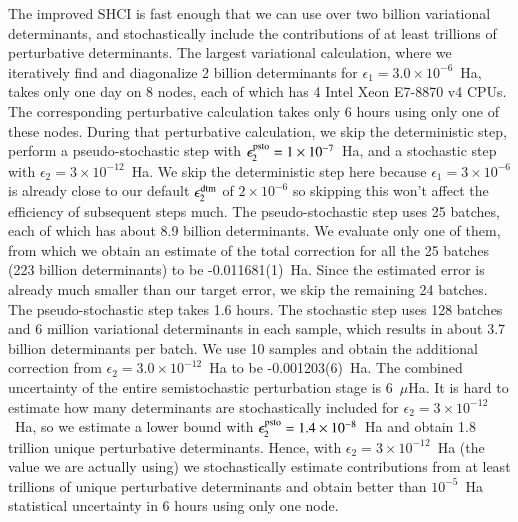 The improved SHCI is fast enough that we can use over two billion variational determinants, and stochastically include the contributions of at least trillions of perturbative determinants.
The largest variational calculation, where we iteratively find and diagonalize 2 billion determinants
for $\epsilon_1=3.0\times10^{-6}$~Ha, takes only one day on 8 nodes, each of which has 4 Intel Xeon E7-8870 v4 CPUs.
The corresponding perturbative calculation takes only 6 hours using only one of these nodes. 
During that perturbative calculation, we skip the deterministic step, perform a pseudo-stochastic step with $\epsilon_2^{\rm psto}=1\times10^{-7}$~Ha, and a stochastic step with $\epsilon_2=3\times10^{-12}$~Ha.
{\color{black}
We skip the deterministic step here because $\epsilon_1=3 \times 10^{-6}$ is already close to our
default $\epsilon_2^{\rm dtm}$ of $2 \times 10^{-6}$ so skipping this won't affect the efficiency
of subsequent steps much.
}
The pseudo-stochastic step uses 25 batches, each of which has about 8.9 billion determinants.
We evaluate only one of them, from which we obtain an estimate of the total correction for all the 25 batches (223 billion determinants) to be -0.011681(1)~Ha.
Since the estimated error is already much smaller than our target error, we skip the remaining 24 batches.
The pseudo-stochastic step takes 1.6 hours.
The stochastic step uses 128 batches and 6 million variational determinants in each sample,
which results in about 3.7 billion determinants per batch.
We use 10 samples and obtain the additional correction from $\epsilon_2=3.0\times10^{-12}$~Ha to be -0.001203(6)~Ha.
The combined uncertainty of the entire semistochastic perturbation stage is 6~$\mu$Ha.
It is hard to estimate how many determinants are stochastically included for $\epsilon_2=3\times10^{-12}$~Ha,
so we estimate a lower bound with $\epsilon_2^{\rm psto}=1.4\times10^{-8}$~Ha and obtain 1.8 trillion unique perturbative determinants.
Hence, with $\epsilon_2=3\times10^{-12}$~Ha (the value we are actually using) we stochastically estimate contributions from
at least trillions of unique perturbative determinants and obtain better than $10^{-5}$~Ha statistical uncertainty in 6 hours using only one node.

